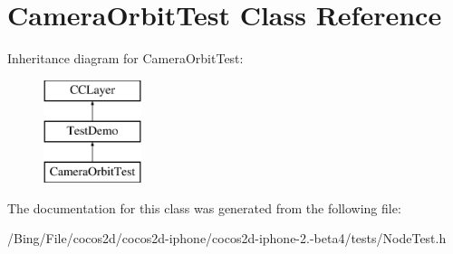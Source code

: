 \hypertarget{interface_camera_orbit_test}{\section{Camera\-Orbit\-Test Class Reference}
\label{interface_camera_orbit_test}
}
Inheritance diagram for Camera\-Orbit\-Test\-:\begin{figure}[H]
\begin{center}
\leavevmode
\includegraphics[height=3.000000cm]{interface_camera_orbit_test}
\end{center}
\end{figure}


The documentation for this class was generated from the following file\-:\begin{DoxyCompactItemize}
\item 
/\-Bing/\-File/cocos2d/cocos2d-\/iphone/cocos2d-\/iphone-\/2.-\/beta4/tests/Node\-Test.\-h\end{DoxyCompactItemize}
